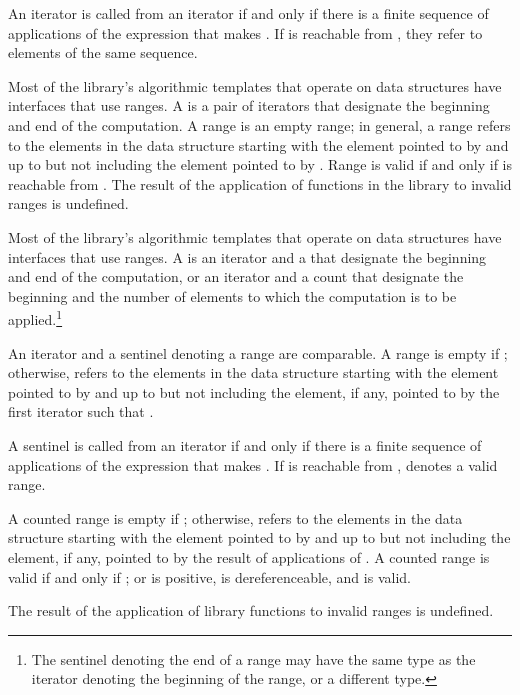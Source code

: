\begin{removedblock}
\pnum
An iterator
is called
from an iterator
if and only if there is a finite sequence of applications of
the expression
that makes
.
If
is reachable from
,
they refer to elements of the same sequence.

\pnum
Most of the library's algorithmic templates that operate on data structures have interfaces that use ranges.
A
is a pair of iterators that designate the beginning and end of the computation.
A range 
is an empty range;
in general, a range 
refers to the elements in the data structure starting with the element
pointed to by
and up to but not including the element pointed to by
.
Range 
is valid if and only if
is reachable from
.
The result of the application of functions in the library to invalid ranges is
undefined.
\end{removedblock}

\begin{addedblock}
\pnum
Most of the library's algorithmic templates that operate on data structures have
interfaces that use ranges. A  is an iterator and a 
that designate the beginning and end of the computation, or an iterator and a
count that designate the beginning and the number of elements to which the
computation is to be applied.\footnote{The sentinel denoting the end of a range
may have the same type as the iterator denoting the beginning of the range, or a
different type.}

\pnum
An iterator and a sentinel denoting a range are comparable.
A range 
is empty if ;
otherwise, 
refers to the elements in the data structure starting with the element
pointed to by
and up to but not including the element, if any, pointed to by
the first iterator  such that .

\pnum
A sentinel  is called  from an iterator  if
and only if there is a finite sequence of applications of the expression
 that makes . If  is reachable from ,
 denotes a valid range.

\pnum
A counted range  is empty if ; otherwise, 
refers to the  elements in the data structure starting with the element
pointed to by  and up to but not including the element, if any, pointed to by
the result of  applications of . A counted range
 is valid if and only if ; or  is positive,
 is dereferenceable, and  is valid.

\pnum
The result of the application of library functions
to invalid ranges is undefined.
\end{addedblock}

